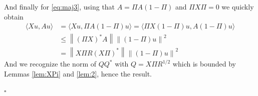 \documentclass[12pt]{amsart}
\def\<{\langle}
\def\>{\rangle}
\newcommand{\ep}{\hfill $\square$}
\numberwithin{equation}{section}
\numberwithin{figure}{section}
\newcommand{\vvert}[1]{\left\lVert#1\right\rVert}
\begin{document}
And finally for \eqref{eq:maj3}, using that $A = \Pi A (1-\Pi)$ and $\Pi X \Pi = 0$ we quickly obtain
\begin{equation*}
\begin{aligned}
    \<Xu,Au\> &= \<Xu,\Pi A(1-\Pi)u\> = \<\Pi X(1-\Pi)u,A(1-\Pi)u\>\\
    &\leq \vvert{(\Pi X)^*A}\vvert{(1-\Pi)u}^2\\
    &= \vvert{X\Pi R(X\Pi)^*}\vvert{(1-\Pi)u}^2
\end{aligned}
\end{equation*}
And we recognize the norm of $QQ^*$ with $Q = X\Pi R^{1/2}$ which is bounded by Lemmas \ref{lem:XPi} and \ref{lem:2}, hence the result.

\ep
\end{document}
